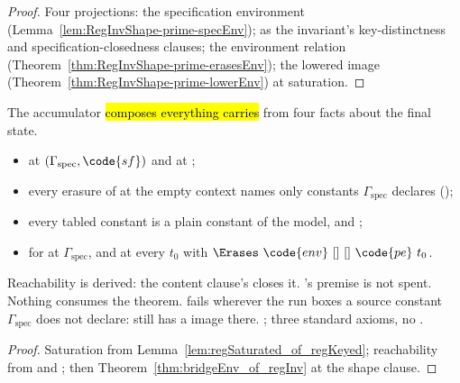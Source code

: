 \begin{proof}
\leanok
{}
 Four projections: the specification environment (Lemma~\ref{lem:RegInvShape-prime-specEnv});
 as the invariant's key-distinctness and specification-closedness clauses; the
environment relation (Theorem~\ref{thm:RegInvShape-prime-erasesEnv}); the lowered image
(Theorem~\ref{thm:RegInvShape-prime-lowerEnv}) at saturation.
\end{proof}
\begin{theorem}
\label{thm:bridgeEnv_of_regContent}
\leanok
{}
 The accumulator \hl{composes everything  carries} from four facts about
the final state.
\begin{itemize}
\item {}  at $(\Gamma_{\mathrm{spec}}, \code{sf})$ and  at
;
\item every erasure of  at the empty context names only constants $\Gamma_{\mathrm{spec}}$
declares ();
\item every tabled constant is a plain constant of the model, and ;
\item {}  for  at $\Gamma_{\mathrm{spec}}$, and 
at every $t_0$ with $\Erases\ \code{env}\ []\ []\ \code{pe}\ t_0$.
\end{itemize}
 Reachability is derived: the content clause's  closes it. 's
\Lower{} premise is not spent.
 Nothing consumes the theorem.  fails wherever the run boxes a
source constant $\Gamma_{\mathrm{spec}}$ does not declare: \Erases{} still has a  image there.
 \stProved{}; three standard axioms, no .
\end{theorem}
\begin{proof}
\leanok
{}
 Saturation from Lemma~\ref{lem:regSaturated_of_regKeyed}; reachability from
 and ; then Theorem~\ref{thm:bridgeEnv_of_regInv} at the shape
clause.
\end{proof}

